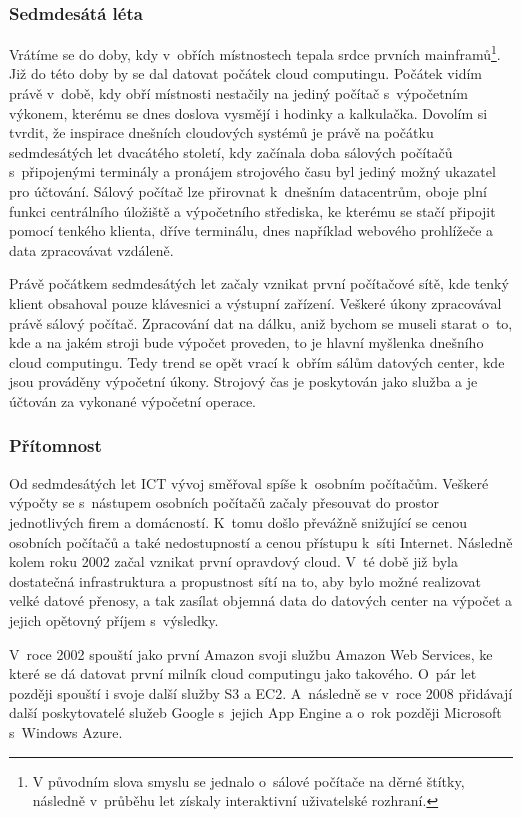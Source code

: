 \subsubsection{Sedmdesátá léta}
Vrátíme se do doby, kdy v~obřích místnostech tepala srdce prvních mainframů\footnote{V původním slova smyslu se jednalo o~sálové počítače na děrné štítky, následně v~průběhu let získaly interaktivní uživatelské rozhraní.}. Již do této doby by se dal datovat počátek cloud computingu. Počátek vidím právě v~době, kdy obří místnosti nestačily na jediný počítač s~výpočetním výkonem, kterému se dnes doslova vysmějí i hodinky a kalkulačka. Dovolím si tvrdit, že inspirace dnešních cloudových systémů je právě na počátku sedmdesátých let dvacátého století, kdy začínala doba sálových počítačů s~připojenými terminály a pronájem strojového času byl jediný možný ukazatel pro účtování. Sálový počítač lze přirovnat k~dnešním datacentrům, oboje plní funkci centrálního úložiště a výpočetního střediska, ke kterému se stačí připojit pomocí tenkého klienta, dříve terminálu, dnes například webového prohlížeče a data zpracovávat vzdáleně.

Právě počátkem sedmdesátých let začaly vznikat první počítačové sítě, kde tenký klient obsahoval pouze klávesnici a výstupní zařízení. Veškeré úkony zpracovával právě sálový počítač. Zpracování dat na dálku, aniž bychom se museli starat o~to, kde a na jakém stroji bude výpočet proveden, to je hlavní myšlenka dnešního cloud computingu. Tedy trend se opět vrací k~obřím sálům datových center, kde jsou prováděny výpočetní úkony. Strojový čas je poskytován jako služba a je účtován za vykonané výpočetní operace.

\subsubsection{Přítomnost}
Od sedmdesátých let ICT vývoj směřoval spíše k~osobním počítačům. Veškeré výpočty se s~nástupem osobních počítačů začaly přesouvat do prostor jednotlivých firem a domácností. K~tomu došlo převážně snižující se cenou osobních počítačů a také nedostupností a cenou přístupu k~síti Internet. Následně kolem roku 2002 začal vznikat první opravdový cloud. V~té době již byla dostatečná infrastruktura a propustnost sítí na to, aby bylo možné realizovat velké datové přenosy, a tak zasílat objemná data do datových center na výpočet a jejich opětovný příjem s~výsledky.

V~roce 2002 spouští jako první Amazon svoji službu Amazon Web Services, ke které se dá datovat první milník cloud computingu jako takového. O~pár let později spouští i svoje další služby S3 a EC2. A~následně se v~roce 2008 přidávají další poskytovatelé služeb Google s~jejich App Engine a o~rok později Microsoft s~Windows Azure.

